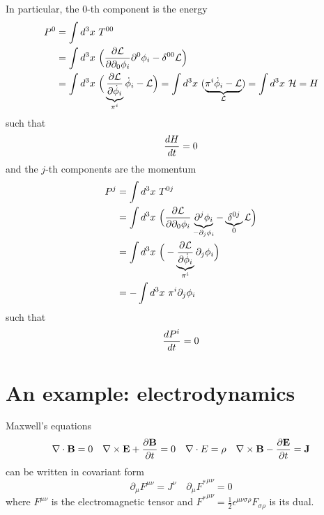     In particular, the $0$-th component is the energy 
    \begin{equation*}
    \begin{aligned}
        P^0 & = \int d^3 x ~ T^{00} \\ & = \int d^3 x ~ \Big ( \frac{\partial\mathcal L}{\partial\partial_0 \phi_i} \partial^0 \phi_i - \delta^{0 0} \mathcal L \Big) \\ & = \int d^3 x ~ \Big ( \underbrace{\frac{\partial\mathcal L}{\partial\dot \phi_i}}_{\pi^i} \dot \phi_i - \mathcal L \Big ) = \int d^3 x ~ (\underbrace{\pi^i \dot \phi_i - \mathcal L}_{\mathcal L}) = \int d^3 x ~ \mathcal H = H
    \end{aligned}
    \end{equation*}
    such that 
    \begin{equation*}
        \frac{dH}{dt} = 0
    \end{equation*} 
    and the $j$-th components are the momentum 
    \begin{equation*}
    \begin{aligned}
        P^j & = \int d^3 x ~ T^{0j} \\ & = \int d^3 x ~ \Big ( \frac{\partial\mathcal L}{\partial\partial_0 \phi_i} \underbrace{\partial^j \phi_i}_{-\partial_j \phi_i} - \underbrace{\delta^{0j}}_0 \mathcal L \Big) \\ & = \int d^3 x ~ \Big ( - \underbrace{\frac{\partial\mathcal L}{\partial\dot \phi_i}}_{\pi^i} \partial_j \phi_i \Big) \\ & = - \int d^3 x ~ \pi^i \partial_j \phi_i
    \end{aligned}
    \end{equation*}
    such that 
    \begin{equation*}
        \frac{dP^i}{dt} = 0
    \end{equation*}

\chapter{An example: electrodynamics}

    Maxwell's equations 
    \begin{equation}\label{eqmax}
        \nabla \cdot \mathbf B = 0 \quad \nabla \times \mathbf E + \frac{\partial\mathbf B}{\partial t} = 0 \quad \nabla \cdot E = \rho \quad \nabla \times \mathbf B - \frac{\partial\mathbf E}{\partial t} = \mathbf J
    \end{equation}
    can be written in covariant form 
    \begin{equation*}
        \partial_\mu F^{\mu\nu} = J^\nu \quad \partial_\mu {F^*}^{\mu\nu} = 0
    \end{equation*}
    where $F^{\mu\nu}$ is the electromagnetic tensor and ${F^*}^{\mu\nu} = \frac{1}{2} \epsilon^{\mu\nu\sigma\rho} F_{\sigma\rho}$ is its dual.

